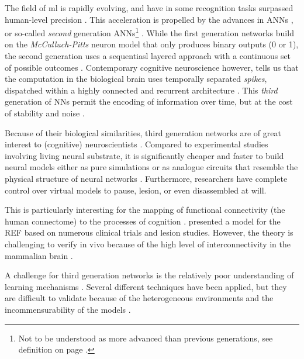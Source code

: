 \documentclass[report.tex]{subfiles}
\begin{document}
The field of \gls{ml} is rapidly evolving, and have in
some recognition tasks surpassed human-level precision
\autocite{Schmidhuber2014}.
This acceleration is propelled by the advances in \gls{ANN}s
\autocite{Rumelhart1988, Schmidhuber2014, Nilsson2009}, or
so-called \textit{second} generation \gls{ANN}s\footnote{Not to be 
understood as more advanced than previous generations, see definition on page
\pageref{sec:glossary}.} \cite{Maass1997}.
While the first generation networks build on the \textit{McCulluch-Pitts}
neuron model that only produces binary outputs (0 or 1), the second
generation uses a sequentiasl layered approach with a continuous set of 
possible outcomes \cite{Maass1997, Russel2007}.
Contemporary cognitive neuroscience however, tells us that the computation
in the biological brain uses temporally separated \textit{spikes}, 
dispatched within a highly connected and recurrent architecture 
\cite{Dayan2001, Eliasmith2004}.
This \textit{third} generation of \gls{NN}s permit the encoding
of information over time, but at the cost of stability and 
noise \autocite{Maass1997}.

Because of their biological similarities, third generation 
networks are of great interest to (cognitive) neuroscientists
\autocite{Dayan2001,Bruderle2011,Eliasmith2015}.
Compared to experimental studies involving living neural substrate,
it is significantly cheaper and faster to build neural 
models either as pure simulations
\autocite{Davison2009, Eliasmith2015} or as analogue circuits
that resemble the physical structure of neural networks
\autocite{Walter2015, Schmitt2017}.
Furthermore, researchers have complete control over virtual models
to pause, lesion, or even disassembled at will.

This is particularly interesting for the
mapping of functional connectivity (the human connectome) to the
processes of cognition \autocite{Eliasmith2015, Mogensen2011}. 
\textcite{Mogensen2011} presented a model for the 
\gls{REF} based on numerous clinical trials and lesion studies.
However, the theory is challenging to verify in vivo because of
the high level of interconnectivity in the mammalian brain
\autocite{Hohwy2009, Mogensen2017}.

A challenge for third generation networks is the relatively
poor understanding of learning mechanisms \autocite{Tavanei2015,
Walter2015}.
Several different techniques have been applied, but they are
difficult to validate because of the heterogeneous environments and
the incommensurability of the models \autocite{Bohte2002, Bruderle2011}.
\end{document}

